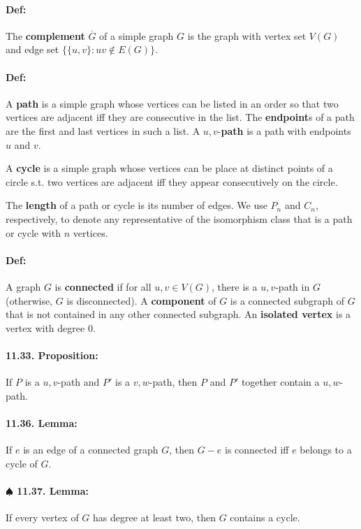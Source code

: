 \documentclass[a4paper, 11pt, twoside]{article}
\begin{document}
\paragraph{Def:} The \textbf{complement} $\overline{G}$ of a simple graph $G$ is the graph with vertex set $V(G)$ and edge set $\{\{u,v\}: uv\not\in E(G)\}$.

\paragraph{Def:} A \textbf{path} is a simple graph whose vertices can be listed in an order so that two vertices are adjacent iff they are consecutive in the list. The \textbf{endpoint}s of a path are the first and last vertices in such a list. A $u,v$-\textbf{path} is a path with endpoints $u$ and $v$.

A \textbf{cycle} is a simple graph whose vertices can be place at distinct points of a circle s.t. two vertices are adjacent iff they appear consecutively on the circle.

The \textbf{length} of a path or cycle is its number of edges. We use $P_n$ and $C_n$, respectively, to denote any representative of the isomorphism class that is a path or cycle with $n$ vertices.

\paragraph{Def:} A graph $G$ is \textbf{connected} if for all $u, v\in V(G)$, there is a $u,v$-path in $G$ (otherwise, $G$ is disconnected). A \textbf{component} of $G$ is a connected subgraph of $G$ that is not contained in any other connected subgraph. An \textbf{isolated vertex} is a vertex with degree $0$.

\paragraph{11.33. Proposition:} If $P$ is a $u,v$-path and $P'$ is a $v,w$-path, then $P$ and $P'$ together contain a $u,w$-path.

\paragraph{11.36. Lemma:} If $e$ is an edge of a connected graph $G$, then $G-e$ is connected iff $e$ belongs to a cycle of $G$.

\paragraph{$\spadesuit$ 11.37. Lemma:} If every vertex of $G$ has degree at least two, then $G$ contains a cycle.
\end{document}
